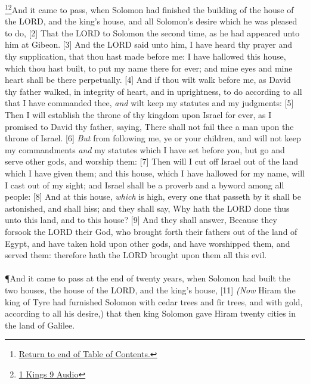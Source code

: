 \footnote{\textcolor[cmyk]{0.99998,1,0,0}{\hyperlink{TOC}{Return to end of Table of Contents.}}}\footnote{\href{https://audiobible.com/bible/1_kings_9.html}{\textcolor[cmyk]{0.99998,1,0,0}{1 Kings 9 Audio}}}\textcolor[cmyk]{0.99998,1,0,0}{And it came to pass, when Solomon had finished the building of the house of the LORD, and the king's house, and all Solomon's desire which he was pleased to do,}
[2] \textcolor[cmyk]{0.99998,1,0,0}{That the LORD  to Solomon the second time, as he had appeared unto him at Gibeon.}
[3] \textcolor[cmyk]{0.99998,1,0,0}{And the LORD said unto him, I have heard thy prayer and thy supplication, that thou hast made before me: I have hallowed this house, which thou hast built, to put my name there for ever; and mine eyes and mine heart shall be there perpetually.}
[4] \textcolor[cmyk]{0.99998,1,0,0}{And if thou wilt walk before me, as David thy father walked, in integrity of heart, and in uprightness, to do according to all that I have commanded thee, \emph{and} wilt keep my statutes and my judgments:}
[5] \textcolor[cmyk]{0.99998,1,0,0}{Then I will establish the throne of thy kingdom upon Israel for ever, as I promised to David thy father, saying, There shall not fail thee a man upon the throne of Israel.}
[6] \textcolor[cmyk]{0.99998,1,0,0}{\emph{But}  from following me, ye or your children, and will not keep my commandments \emph{and} my statutes which I have set before you, but go and serve other gods, and worship them:}
[7] \textcolor[cmyk]{0.99998,1,0,0}{Then will I cut off Israel out of the land which I have given them; and this house, which I have hallowed for my name, will I cast out of my sight; and Israel shall be a proverb and a byword among all people:}
[8] \textcolor[cmyk]{0.99998,1,0,0}{And at this house, \emph{which} is high, every one that passeth by it shall be astonished, and shall hiss; and they shall say, Why hath the LORD done thus unto this land, and to this house?}
[9] \textcolor[cmyk]{0.99998,1,0,0}{And they shall answer, Because they forsook the LORD their God, who brought forth their fathers out of the land of Egypt, and have taken hold upon other gods, and have worshipped them, and served them: therefore hath the LORD brought upon them all this evil.}\\
\\
\P \textcolor[cmyk]{0.99998,1,0,0}{And it came to pass at the end of twenty years, when Solomon had built the two houses, the house of the LORD, and the king's house,}
[11] \textcolor[cmyk]{0.99998,1,0,0}{\emph{(Now} Hiram the king of Tyre had furnished Solomon with cedar trees and fir trees, and with gold, according to all his desire,) that then king Solomon gave Hiram twenty cities in the land of Galilee.}
